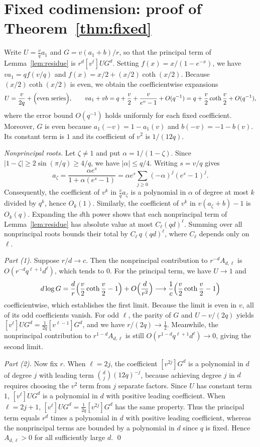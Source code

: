 \documentclass[11pt]{amsart}
\theoremstyle{remark}
\begin{document}
\section{Fixed codimension: proof of Theorem~\ref{thm:fixed}}\label{sec:fixed}

Write $U=\frac vqa_1$ and $G=v(a_1+b)/r$, so that the principal term of
Lemma~\ref{lem:residue} is $r^d[v^\ell]UG^d$. Setting $f(x)=x/(1-e^{-x})$, we
have $va_1=qf(v/q)$ and $f(x)=x/2+(x/2)\coth(x/2)$. Because $(x/2)\coth(x/2)$
is even, we obtain the coefficientwise expansions
\[
 U=\frac{v}{2q}+\Bigl(\text{even series}\Bigr),\qquad
 va_1+vb=q+\frac v2+\frac{v}{e^v-1}+O(q^{-1})=q+\frac v2\coth\frac v2+O(q^{-1}),
\]
where the error bound $O(q^{-1})$ holds uniformly for each fixed coefficient.
Moreover, $G$ is even because $a_1(-v)=1-a_1(v)$ and $b(-v)=-1-b(v)$. Its
constant term is $1$ and its coefficient of $v^2$ is $1/(12q)$.

\emph{Nonprincipal roots.} Let $\zeta\ne1$ and put $\alpha=1/(1-\zeta)$. Since
$|1-\zeta|\ge2\sin(\pi/q)\ge4/q$, we have $|\alpha|\le q/4$. Writing $s=v/q$
gives
\[
 a_\zeta=\frac{\alpha e^s}{1+\alpha(e^s-1)}=\alpha e^s\sum_{j\ge0}(-\alpha)^j(e^s-1)^j.
\]
Consequently, the coefficient of $v^k$ in $\frac vqa_\zeta$ is a polynomial in
$\alpha$ of degree at most $k$ divided by $q^k$, hence $O_k(1)$. Similarly,
the coefficient of $v^k$ in $v(a_\zeta+b)-1$ is $O_k(q)$. Expanding the $d$th
power shows that each nonprincipal term of Lemma~\ref{lem:residue} has
absolute value at most $C_\ell(qd)^\ell$. Summing over all nonprincipal roots
bounds their total by $C_\ell\,q\,(qd)^\ell$, where $C_\ell$ depends only on
$\ell$.

\emph{Part (1).} Suppose $r/d\to c$. Then the nonprincipal contribution
to $r^{-d}A_{d,\ell}$ is $O(r^{-d}q^{\ell+1}d^\ell)$, which tends to $0$.
For the principal term, we have $U\to1$ and
\[
 d\log G=\frac dr\Bigl(\frac v2\coth\frac v2-1\Bigr)+O\Bigl(\frac d{r^2}\Bigr)
 \longrightarrow\frac1c\Bigl(\frac v2\coth\frac v2-1\Bigr)
\]
coefficientwise, which establishes the first limit. Because the limit is even
in $v$, all of its odd coefficients vanish. For odd $\ell$, the parity of $G$
and $U-v/(2q)$ yields $[v^\ell]UG^d=\frac1{2q}[v^{\ell-1}]G^d$, and we have
$r/(2q)\to\frac12$. Meanwhile, the nonprincipal contribution to
$r^{1-d}A_{d,\ell}$ is still $O(r^{1-d}q^{\ell+1}d^\ell)\to0$, giving the
second limit.

\emph{Part (2).} Now fix $r$. When $\ell=2j$, the coefficient $[v^{2j}]G^d$ is
a polynomial in $d$ of degree $j$ with leading term $\binom dj(12q)^{-j}$,
because achieving degree $j$ in $d$ requires choosing the $v^2$ term from $j$
separate factors. Since $U$ has constant term $1$, $[v^\ell]UG^d$ is a
polynomial in $d$ with positive leading coefficient. When $\ell=2j+1$,
$[v^\ell]UG^d=\frac1{2q}[v^{2j}]G^d$ has the same property. Thus the principal
term equals $r^d$ times a polynomial in $d$ with positive leading coefficient,
whereas the nonprincipal terms are bounded by a polynomial in $d$ since $q$ is
fixed. Hence $A_{d,\ell}>0$ for all sufficiently large $d$. \qed
\end{document}

